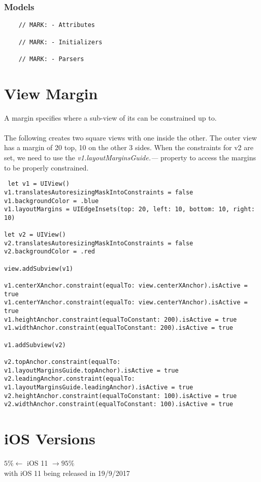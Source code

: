 \documentclass[]{article}
\newcommand{\<}{\guilsinglleft}
\renewcommand{\>}{\guilsinglright}
\renewcommand{\it}[1]{\textit{#1}}
\begin{document}
\subsubsection{Models}
\begin{lstlisting}
	// MARK: - Attributes
	
	// MARK: - Initializers
	
	// MARK: - Parsers
\end{lstlisting}
\cite{medium-ios-code-snipets}

\section{View Margin}
A margin specifies where a sub-view of its can be constrained up to.
\\\\
The following creates two square views with one inside the other.  The outer view has a margin of 20 top, 10 on the other 3 sides.  When the constraints for v2 are set, we need to use the \it{v1.layoutMarginsGuide.---} property to access the margins to be properly constrained. \cite[pp.42]{Programming-iOS10}
\begin{lstlisting}
 let v1 = UIView()
v1.translatesAutoresizingMaskIntoConstraints = false
v1.backgroundColor = .blue
v1.layoutMargins = UIEdgeInsets(top: 20, left: 10, bottom: 10, right: 10)

let v2 = UIView()
v2.translatesAutoresizingMaskIntoConstraints = false
v2.backgroundColor = .red

view.addSubview(v1)

v1.centerXAnchor.constraint(equalTo: view.centerXAnchor).isActive = true
v1.centerYAnchor.constraint(equalTo: view.centerYAnchor).isActive = true
v1.heightAnchor.constraint(equalToConstant: 200).isActive = true
v1.widthAnchor.constraint(equalToConstant: 200).isActive = true

v1.addSubview(v2)

v2.topAnchor.constraint(equalTo: v1.layoutMarginsGuide.topAnchor).isActive = true
v2.leadingAnchor.constraint(equalTo: v1.layoutMarginsGuide.leadingAnchor).isActive = true
v2.heightAnchor.constraint(equalToConstant: 100).isActive = true
v2.widthAnchor.constraint(equalToConstant: 100).isActive = true
\end{lstlisting}

\section{iOS Versions}
$5\% \leftarrow$  iOS 11 $\rightarrow 95\%$
\\
with iOS 11 being released in 19/9/2017
\end{document}
